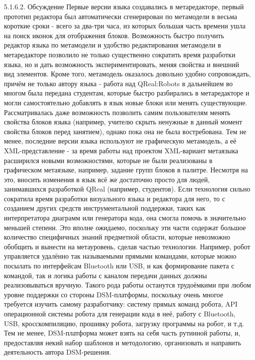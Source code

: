 5.1.6.2. Обсуждение
	Первые версии языка создавались в метаредакторе, первый прототип редактора был автоматически сгенерирован по метамодели в весьма короткие сроки - всего за два-три часа, из которых большая часть времени ушла на поиск иконок для отображения блоков. Возможность быстро получить редактор языка по метамодели и удобство редактирования метамодели в метаредакторе позволило не только существенно сократить время разработки языка, но и дать возможность экспериментировать, меняя свойства и внешний вид элементов. Кроме того, метамодель оказалось довольно удобно сопровождать, причём не только автору языка - работа над QReal:Robots в дальнейшем во многом была передана студентам, которые быстро разбирались в метаредакторе и могли самостоятельно добавлять в язык новые блоки или менять существующие. Рассматривалась даже возможность позволить самим пользователям менять свойства блоков языка (например, учителю скрыть ненужные в данный момент свойства блоков перед занятием), однако пока она не была востребована. Тем не менее, последние версии языка используют не графическую метамодель, а её XML-представление - за время работы над проектом XML-вариант метаязыка расширился новыми возможностями, которые не были реализованы в графическом метаязыке, например, задание групп блоков в палитре. Несмотря на это, вносить изменения в язык всё же достаточно просто для людей, занимавшихся разработкой QReal (например, студентов).
	Если технология сильно сократила время разработки визуального языка и редактора для него, то с созданием других средств инструментальной поддержки, таких как интерпретатора диаграмм или генератора кода, она смогла помочь в значительно меньшей степени. Это вполне ожидаемо, поскольку эти части содержат большое количество специфичных знаний предметной области, которые невозможно обобщить и вынести на метауровень, сделав частью технологии. Например, робот управляется удалённо так называемыми прямыми командами, которые можно посылать по интерфейсам Bluetooth или USB, и как формирование пакета с командой, так и логика работы с каналом передачи данных должны реализовываться вручную. Такого рода работы останутся трудоёмкими при любом уровне поддержки со стороны DSM-платформы, поскольку очень многое требуется изучить самому разработчику: систему прямых команд робота, API операционной системы робота для генерации кода в неё, работу с Bluetooth, USB, кросскомпиляцию, прошивку робота, загрузку программы на робот, и т.д. Тем не менее, DSM-платформа может взять на себя часть рутинной работы, и, предоставляя некий набор шаблонов и методологию, организовать и направить деятельность автора DSM-решения.
